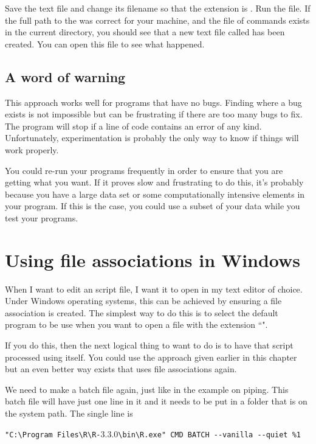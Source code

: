 Save the text file and change its filename so that the extension is . Run the file. If the full path to the  was correct for your machine, and the file of commands  exists in the current directory, you should see that a new text file called  has been created. You can open this file to see what happened. 
 
\subsection*{A word of warning} 
 
This approach works well for programs that have no bugs. Finding where a bug exists is not impossible but can be frustrating if there are too many bugs to fix. The program will stop if a line of code contains an error of any kind. Unfortunately, experimentation is probably the only way to know if things will work properly.  
 
You could re-run your programs frequently in order to ensure that you are getting what you want. If it proves slow and frustrating to do this, it's probably because you have a large data set or some computationally intensive elements in your program. If this is the case, you could use a subset of your data while you test your programs. 
 
 
 
\section{Using file associations in Windows} 
 
When I want to edit an \R{} script file, I want it to open in my text editor of choice. Under Windows operating systems, this can be achieved by ensuring a file association is created. The simplest way to do this is to select the default program to be use when you want to open a file with the extension ``". 
 
If you do this, then the next logical thing to want to do is to have that \R{} script processed using \R{} itself. You could use the approach given earlier in this chapter but an even better way exists that uses file associations again. 
 
We need to make a batch file again, just like in the example on piping. This batch file will have just one line in it and it needs to be put in a folder that is on the system path. The single line is 
\begin{center} 
\verb+"C:\Program Files\R\R-+3.3.0\verb+\bin\R.exe" CMD BATCH --vanilla --quiet %1+ 
\end{center} 
 
